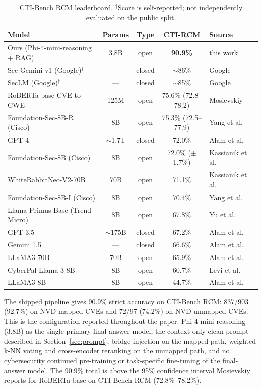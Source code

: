\begin{table}[t]
\centering
\footnotesize
\renewcommand{\arraystretch}{1.08}
\setlength{\tabcolsep}{5pt}
\caption{CTI-Bench RCM leaderboard. $^\dagger$Score is self-reported; not independently evaluated on the public split.}
\label{tab:leaderboard}
\begin{tabularx}{0.94\textwidth}{@{}Ycccp{0.20\textwidth}@{}}
\toprule
\textbf{Model} & \textbf{Params} & \textbf{Type} & \textbf{CTI-RCM} & \textbf{Source} \\
\midrule
Ours (Phi-4-mini-reasoning + RAG) & 3.8B & open & \textbf{90.9\%} & this work \\
Sec-Gemini v1 (Google)$^\dagger$ & --- & closed & $\sim$86\% & Google~\cite{google-2025a} \\
SecLM (Google)$^\dagger$ & --- & closed & $\sim$85\% & Google~\cite{google-2025b} \\
RoBERTa-base CVE-to-CWE & 125M & open & 75.6\% (72.8--78.2) & Mosievskiy~\cite{mosievskiy-2026} \\
Foundation-Sec-8B-R (Cisco) & 8B & open & 75.3\% (72.5--77.9) & Yang et al.~\cite{yang-2026} \\
GPT-4 & $\sim$1.7T & closed & 72.0\% & Alam et al.~\cite{alam-2024} \\
Foundation-Sec-8B (Cisco) & 8B & open & 72.0\% ($\pm$1.7\%) & Kassianik et al.~\cite{kassianik-2025} \\
WhiteRabbitNeo-V2-70B & 70B & open & 71.1\% & Kassianik et al.~\cite{kassianik-2025} \\
Foundation-Sec-8B-I (Cisco) & 8B & open & 70.4\% & Yang et al.~\cite{yang-2026} \\
Llama-Primus-Base (Trend Micro) & 8B & open & 67.8\% & Yu et al.~\cite{yu-2025} \\
GPT-3.5 & $\sim$175B & closed & 67.2\% & Alam et al.~\cite{alam-2024} \\
Gemini 1.5 & --- & closed & 66.6\% & Alam et al.~\cite{alam-2024} \\
LLaMA3-70B & 70B & open & 65.9\% & Alam et al.~\cite{alam-2024} \\
CyberPal-Llama-3-8B & 8B & open & 60.7\% & Levi et al.~\cite{levi-2024} \\
LLaMA3-8B & 8B & open & 44.7\% & Alam et al.~\cite{alam-2024} \\
\bottomrule
\end{tabularx}
\end{table}

The shipped pipeline gives 90.9\% strict accuracy on CTI-Bench RCM: 837/903 (92.7\%) on NVD-mapped CVEs and 72/97 (74.2\%) on NVD-unmapped CVEs. This is the configuration reported throughout the paper: Phi-4-mini-reasoning (3.8B) as the single primary final-answer model, the context-only clean prompt described in Section~\ref{sec:prompt}, bridge injection on the mapped path, weighted k-NN voting and cross-encoder reranking on the unmapped path, and no cybersecurity continued pre-training or task-specific fine-tuning of the final-answer model. The 90.9\% total is above the 95\% confidence interval Mosievskiy \cite{mosievskiy-2026} reports for RoBERTa-base on CTI-Bench RCM (72.8\%--78.2\%).

